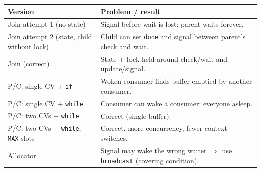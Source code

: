 \documentclass[11pt,a4paper]{article}
\begin{document}
\begin{center}
\renewcommand{\arraystretch}{1.18}
\small
\begin{tabularx}{\textwidth}{@{}lX@{}}
  \toprule
  \textbf{Version} & \textbf{Problem / result} \\
  \midrule
  Join attempt 1 (no state) & Signal before wait is lost: parent waits forever. \\
  Join attempt 2 (state, child without lock) & Child can set \texttt{done} and signal between parent's check and wait. \\
  Join (correct) & State + lock held around check/wait and update/signal. \\
  P/C: single CV + \texttt{if} & Woken consumer finds buffer emptied by another consumer. \\
  P/C: single CV + \texttt{while} & Consumer can wake a consumer: everyone asleep. \\
  P/C: two CVs + \texttt{while} & Correct (single buffer). \\
  P/C: two CVs + \texttt{while}, \texttt{MAX} slots & Correct, more concurrency, fewer context switches. \\
  Allocator & Signal may wake the wrong waiter \(\Rightarrow\) use \texttt{broadcast} (covering condition). \\
  \bottomrule
\end{tabularx}
\end{center}
\end{document}
